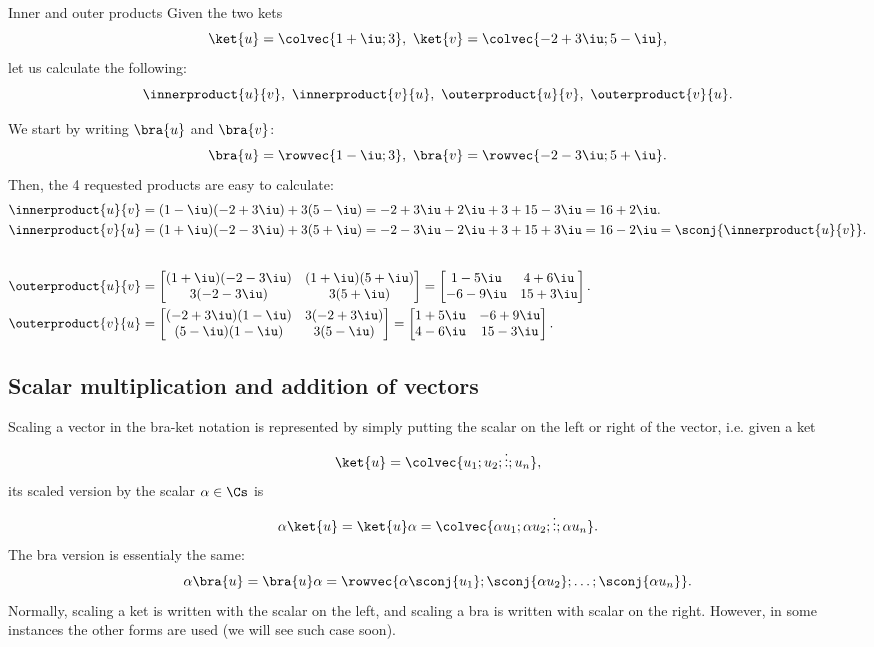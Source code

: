 \begin{example}{Inner and outer products}{}
	Given the two kets
	\[
		\ket{u}=\colvec{1+\iu;3},\ \ket{v}=\colvec{-2+3\iu;5-\iu},
	\]
	let us calculate the following:
	\[
		\innerproduct{u}{v},\ \innerproduct{v}{u},\ \outerproduct{u}{v},\ \outerproduct{v}{u}.
	\]

	We start by writing $\bra{u}$ and $\bra{v}$:
	\[
		\bra{u}=\rowvec{1-\iu;3},\ \bra{v}=\rowvec{-2-3\iu;5+\iu}.
	\]
	Then, the 4 requested products are easy to calculate:
	\begin{align*}
		\innerproduct{u}{v} &= (1-\iu)(-2+3\iu) + 3(5-\iu) = -2+3\iu+2\iu+3+15-3\iu = 16+2\iu.\\
		\innerproduct{v}{u} &= (1+\iu)(-2-3\iu) + 3(5+\iu) = -2-3\iu-2\iu+3+15+3\iu = 16-2\iu = \sconj{\innerproduct{u}{v}}.\\[2em]
		\outerproduct{u}{v} &=
			\begin{bmatrix}
				(1+\iu)(-2-3\iu) & (1+\iu)(5+\iu)\\
				3(-2-3\iu) & 3(5+\iu)
			\end{bmatrix}
			=
			\begin{bmatrix}
				1-5\iu & 4+6\iu\\
				-6-9\iu & 15+3\iu
			\end{bmatrix}.\\
		\outerproduct{v}{u} &=
			\begin{bmatrix}
				(-2+3\iu)(1-\iu) & 3(-2+3\iu)\\
				(5-\iu)(1-\iu) & 3(5-\iu)
			\end{bmatrix}
			=
			\begin{bmatrix}
				1+5\iu & -6+9\iu\\
				4-6\iu & 15-3\iu
			\end{bmatrix}.
	\end{align*}
\end{example}

\subsection{Scalar multiplication and addition of vectors}
Scaling a vector in the bra-ket notation is represented by simply putting the scalar on the left or right of the vector, i.e. given a ket
\[
	\ket{u}=\colvec{u_{1};u_{2};\vdots;u_{n}},
\]
its scaled version by the scalar $\alpha\in\Cs$ is
\begin{equation}
	\alpha\ket{u} = \ket{u}\alpha = \colvec{\alpha u_{1};\alpha u_{2};\vdots;\alpha u_{n}}.
	\label{eq:scaling_ket}
\end{equation}
The bra version is essentialy the same:
\begin{equation}
	\alpha\bra{u} = \bra{u}\alpha = \rowvec{\alpha \sconj{u_{1}};\sconj{\alpha u_{2}};\dots;\sconj{\alpha u_{n}}}.
	\label{eq:scaling_bra}
\end{equation}
Normally, scaling a ket is written with the scalar on the left, and scaling a bra is written with scalar on the right. However, in some instances the other forms are used (we will see such case soon).

